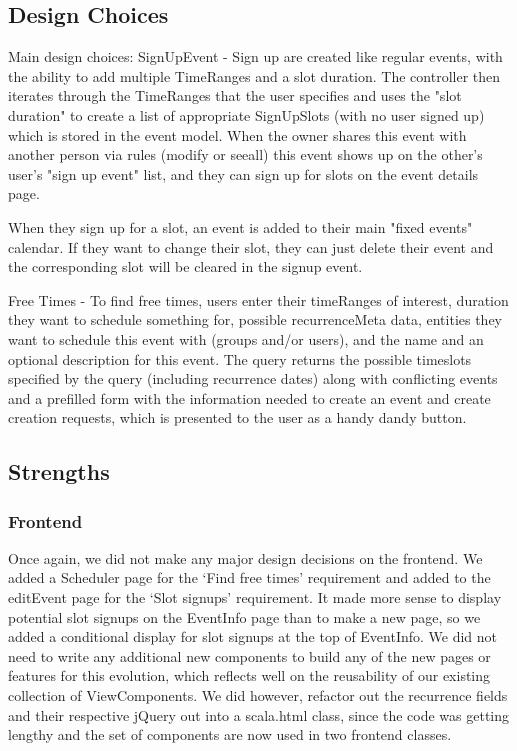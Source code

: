 \documentclass{article}
\begin{document}
\subsection{Design Choices}
Main design choices:
SignUpEvent - Sign up are created like regular events, with the ability to add multiple TimeRanges and a slot duration. The controller then iterates through the TimeRanges that the user specifies and uses the "slot duration" to create a list of appropriate SignUpSlots (with no user signed up) which is stored in the event model. When the owner shares this event with another person via rules (modify or seeall) this event shows up on the other's user's "sign up event" list, and they can sign up for slots on the event details page.

When they sign up for a slot, an event is added to their main "fixed events" calendar. If they want to change their slot, they can just delete their event and the corresponding slot will be cleared in the signup event.

Free Times - To find free times, users enter their timeRanges of interest, duration they want to schedule something for, possible recurrenceMeta data, entities they want to schedule this event with (groups and/or users), and the name and an optional description for this event. The query returns the possible timeslots specified by the query (including recurrence dates) along with conflicting events and a prefilled form with the information needed to create an event and create creation requests, which is presented to the user as a handy dandy button.

\subsection{Strengths}
\subsubsection{Frontend}
Once again, we did not make any major design decisions on the frontend. We added a Scheduler page for the ‘Find free times’ requirement and added to the editEvent page for the ‘Slot signups’ requirement. It made more sense to display potential slot signups on the EventInfo page than to make a new page, so we added a conditional display for slot signups at the top of EventInfo. We did not need to write any additional new components to build any of the new pages or features for this evolution, which reflects well on the reusability of our existing collection of ViewComponents. We did however, refactor out the recurrence fields and their respective jQuery out into a scala.html class, since the code was getting lengthy and the set of components are now used in two frontend classes.
\end{document}
